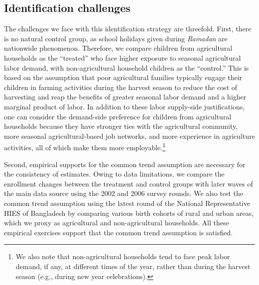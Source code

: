 \documentclass[12pt,letterpaper]{article}
\newcommand{\0}{\ensuremath{\mbox{\boldmath $0$}}}
\begin{document}
\subsection{Identification challenges \label{sec.identification_challange}}

The challenges we face with this identification strategy are threefold. First, there is no natural control group, as school holidays given during \textit{Ramadan} are nationwide phenomenon. Therefore, we compare children from agricultural households as the ``treated'' who face higher exposure to seasonal agricultural labor demand, with non-agricultural household children as the ``control.'' This is based on the assumption that poor agricultural families typically engage their children in farming activities during the harvest season to reduce the cost of harvesting and reap the benefits of greater seasonal labor demand and a higher marginal product of labor. In addition to these labor supply-side justifications, one can consider the demand-side preference for children from agricultural households because they have stronger ties with the agricultural community, more seasonal agricultural-based job networks, and more experience in agriculture activities, all of which make them more employable.\footnote{We also note that non-agricultural households tend to face peak labor demand, if any, at different times of the year, rather than during the harvest season (e.g., during new year celebrations). }

Second, empirical supports for the common trend assumption are necessary for the consistency of estimates. Owing to data limitations, we compare the enrollment changes between the treatment and control groups with later waves of the main data source using the 2002 and 2006 survey rounds. We also test the common trend assumption using the latest round of the National Representative HIES of Bangladesh by comparing various birth cohorts of rural and urban areas, which we proxy as agricultural and non-agricultural households.  All these empirical exercises support that the common trend assumption is satisfied.  
 
\end{document}
